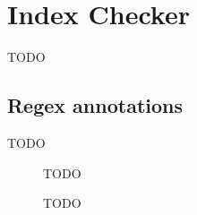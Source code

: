 \chapter{Index Checker\label{index-checker}}
TODO

\section{Regex annotations\label{regex-annotations}}
TODO

\begin{figure}
\caption{TODO}
\label{fig-index-figure}
\end{figure}

\begin{figure}
\caption{TODO}
\label{fig-index-heirarchy}
\end{figure}
